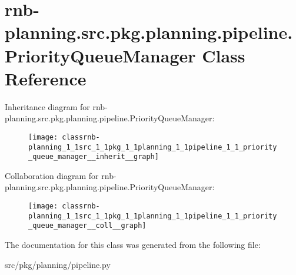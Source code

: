 \hypertarget{classrnb-planning_1_1src_1_1pkg_1_1planning_1_1pipeline_1_1_priority_queue_manager}{}\section{rnb-\/planning.src.\+pkg.\+planning.\+pipeline.\+Priority\+Queue\+Manager Class Reference}
\label{classrnb-planning_1_1src_1_1pkg_1_1planning_1_1pipeline_1_1_priority_queue_manager}


Inheritance diagram for rnb-\/planning.src.\+pkg.\+planning.\+pipeline.\+Priority\+Queue\+Manager\+:
\nopagebreak
\begin{figure}[H]
\begin{center}
\leavevmode
\texttt{[image: classrnb-planning\_1\_1src\_1\_1pkg\_1\_1planning\_1\_1pipeline\_1\_1\_priority\_queue\_manager\_\_inherit\_\_graph]}
\end{center}
\end{figure}


Collaboration diagram for rnb-\/planning.src.\+pkg.\+planning.\+pipeline.\+Priority\+Queue\+Manager\+:
\nopagebreak
\begin{figure}[H]
\begin{center}
\leavevmode
\texttt{[image: classrnb-planning\_1\_1src\_1\_1pkg\_1\_1planning\_1\_1pipeline\_1\_1\_priority\_queue\_manager\_\_coll\_\_graph]}
\end{center}
\end{figure}


The documentation for this class was generated from the following file\+:\begin{DoxyCompactItemize}
\item 
src/pkg/planning/pipeline.\+py\end{DoxyCompactItemize}
